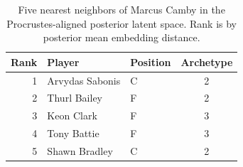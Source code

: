 \begin{table}[htbp]
  \centering\small
  \begin{tabular}{rllc}
    \toprule
    Rank & Player & Position & Archetype \\
    \midrule
    1 & Arvydas Sabonis & C & 2 \\
    2 & Thurl Bailey & F & 2 \\
    3 & Keon Clark & F & 3 \\
    4 & Tony Battie & F & 3 \\
    5 & Shawn Bradley & C & 2 \\
    \bottomrule
  \end{tabular}
  \caption{Five nearest neighbors of Marcus Camby in the Procrustes-aligned posterior latent space. Rank is by posterior mean embedding distance.}
  \label{tab:Marcus_Camby_neighbors}
\end{table}

